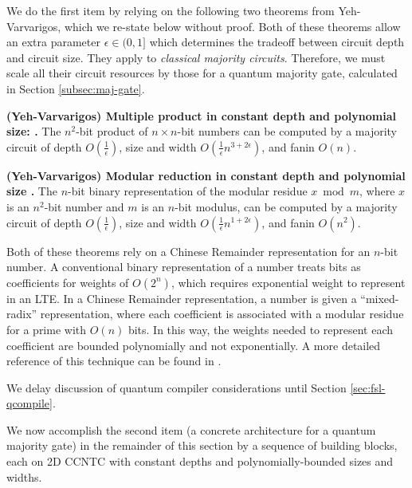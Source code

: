 We do the first item by relying on the following two theorems from Yeh-Varvarigos,
which we re-state below without proof. Both of these theorems
allow an extra parameter $\epsilon \in (0,1]$ which determines the
tradeoff between circuit depth and circuit size. They apply to \emph{classical majority circuits}.
Therefore, we must scale all their circuit resources by those for a quantum majority
gate, calculated in Section \ref{subsec:maj-gate}.

\begin{theorem}{\textbf{(Yeh-Varvarigos) Multiple product in constant depth and polynomial size: \cite{Yeh1996}.}}
The $n^2$-bit product of $n\times n$-bit numbers can be computed by a
majority circuit of depth $O(\frac{1}{\epsilon})$,
size and width $O(\frac{1}{\epsilon}n^{3+2\epsilon})$, and
fanin $O(n)$.
\label{thm:mult-prod}
\end{theorem}

\begin{theorem}{\textbf{(Yeh-Varvarigos) Modular reduction in constant depth and polynomial size \cite{Yeh1996}.}}
The $n$-bit binary representation of the modular residue $x \bmod m$, where
$x$ is an $n^2$-bit number and $m$ is an $n$-bit modulus, can be computed
by a majority circuit of depth $O(\frac{1}{\epsilon})$,
size and width $O(\frac{1}{\epsilon}n^{1 + 2\epsilon})$, and
fanin $O(n^2)$.
\label{thm:mod-reduce}
\end{theorem}

Both of these theorems rely on a Chinese Remainder representation for
an $n$-bit number. A conventional binary representation of a number
treats bits as coefficients for weights of $O(2^n)$, which requires exponential
weight to represent in an LTE. In a Chinese Remainder representation,
a number is given a ``mixed-radix'' representation, where each coefficient
is associated with a modular residue for a prime with $O(n)$ bits. In this
way, the weights needed to represent each coefficient are bounded
polynomially and not exponentially.
A more detailed reference of this technique can be found in \cite{Reif1992}.

We delay discussion of quantum compiler considerations until Section
\ref{sec:fsl-qcompile}.

We now accomplish the second item (a concrete architecture for a quantum majority gate)
in the remainder of this section by a sequence of building blocks, each on
\textsf{2D CCNTC} with constant depths and polynomially-bounded sizes and widths.

